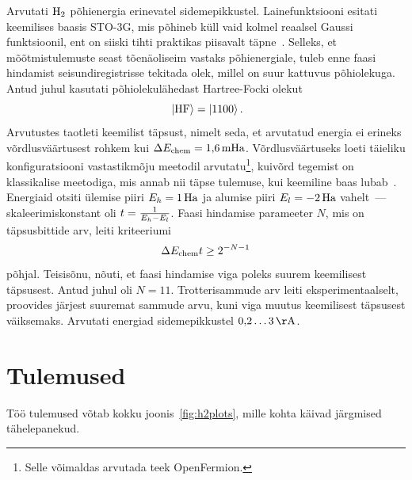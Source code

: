 \documentclass[12pt]{report}
\def\ket#1{\left|#1\right>}
\begin{document}
Arvutati \(\rm H_2\) põhienergia erinevatel sidemepikkustel.
Lainefunktsiooni esitati keemilises baasis STO-3G, mis põhineb küll vaid kolmel reaalsel Gaussi funktsioonil, ent on siiski tihti praktikas piisavalt täpne~\cite{whitfield+etal2011,omalley+etal}.
Selleks, et mõõtmistulemuste seast tõenäoliseim vastaks põhienergiale, tuleb enne faasi hindamist seisundiregistrisse tekitada olek, millel on suur kattuvus põhiolekuga.
Antud juhul kasutati põhiolekulähedast Hartree-Focki olekut
\begin{equation}
  \ket{\rm HF}=\ket{1100}\rlap.
\end{equation}
Arvutustes taotleti keemilist täpsust, nimelt seda, et arvutatud energia ei erineks võrdlusväärtusest rohkem kui \(\Delta E_{\rm chem}=1{,}6\,{\rm mHa}\).
Võrdlusväärtuseks loeti täieliku konfiguratsiooni vastastikmõju meetodil arvutatu\footnote{Selle võimaldas arvutada teek OpenFermion.}, kuivõrd tegemist on klassikalise meetodiga, mis annab nii täpse tulemuse, kui keemiline baas lubab~\cite{mcardle+etal}.
Energiaid otsiti ülemise piiri \(E_h=1\,{\rm Ha}\) ja alumise piiri \(E_l=-2\,{\rm Ha}\) vahelt~--- skaleerimiskonstant oli \(t={1\over E_h-E_l}\).
Faasi hindamise parameeter $N$, mis on täpsusbittide arv, leiti kriteeriumi
\begin{equation}
  \Delta E_{\rm chem}t\ge 2^{-N-1}
\end{equation}
põhjal.
Teisisõnu, nõuti, et faasi hindamise viga poleks suurem keemilisest täpsusest.
Antud juhul oli $N=11$.
Trotterisammude arv leiti eksperimentaalselt, proovides järjest suuremat sammude arvu, kuni viga muutus keemilisest täpsusest väiksemaks.
Arvutati energiad sidemepikkustel \(0{,}2\ldots 3\,{\rm Å}\).

\section{Tulemused}

Töö tulemused võtab kokku joonis~\ref{fig:h2plots}, mille kohta käivad järgmised tähelepanekud.
\end{document}
